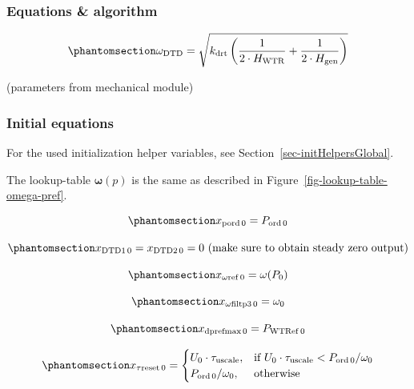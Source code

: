 \documentclass[
  a4paper,
  DIV=11,
  numbers=noendperiod]{scrartcl}
\begin{document}
\subsubsection{Equations \& algorithm ~}\label{equations-algorithm}

\begin{equation}\phantomsection\label{eq-omegaDtd}{
\omega_{\mathrm{DTD}} = \sqrt{k_{\mathrm{drt}} \left( \frac{1}{2 \cdot H_{\mathrm{WTR}}} + \frac{1}{2 \cdot H_{\mathrm{gen}}} \right)}
}\end{equation}

(parameters from mechanical module)

\subsubsection{Initial equations}\label{initial-equations}

For the used initialization helper variables, see
Section~\ref{sec-initHelpersGlobal}.

The lookup-table \(\mathbf{\omega}(p)\) is the same as described in
Figure~\ref{fig-lookup-table-omega-pref}.

\begin{equation}\phantomsection\label{eq-initPOrd}{
x_\mathrm{pord\,0} = P_\mathrm{ord\,0}
}\end{equation}

\begin{equation}\phantomsection\label{eq-initDtd}{
x_\mathrm{DTD1\,0} = x_\mathrm{DTD2\,0} = 0 \text{ (make sure to obtain steady zero output)}
}\end{equation}

\begin{equation}\phantomsection\label{eq-initOmegaRef}{
x_\mathrm{\omega ref\,0} = \mathbf{\omega}(P_\mathrm{0})
}\end{equation}

\begin{equation}\phantomsection\label{eq-initOmegaFiltP3}{
x_\mathrm{\omega filtp3\,0} = \omega_0
}\end{equation}

\begin{equation}\phantomsection\label{eq-initDPRefMax}{
x_\mathrm{dprefmax\,0} = P_\mathrm{WTRef\,0}
}\end{equation}

\begin{equation}\phantomsection\label{eq-initDTauMax}{
x_\mathrm{\tau reset\,0} = 
\begin{cases}
    U_\mathrm{0} \cdot \tau_\mathrm{uscale}, & \text{if } U_\mathrm{0} \cdot \tau_\mathrm{uscale} < P_\mathrm{ord\,0}/\omega_0\\
    P_\mathrm{ord\,0}/\omega_0,              & \mathrm{otherwise}
\end{cases}
}\end{equation}
\end{document}
